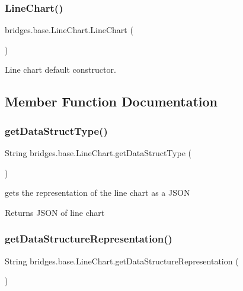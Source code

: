 \subsubsection{\texorpdfstring{Line\+Chart()}{LineChart()}}
{\footnotesize\ttfamily bridges.\+base.\+Line\+Chart.\+Line\+Chart (\begin{DoxyParamCaption}{ }\end{DoxyParamCaption})}



Line chart default constructor. 



\subsection{Member Function Documentation}
\mbox{\label{classbridges_1_1base_1_1_line_chart_ae5d7ebffc6f29256f6fff368ef9a6c84}} 
\subsubsection{\texorpdfstring{get\+Data\+Struct\+Type()}{getDataStructType()}}
{\footnotesize\ttfamily String bridges.\+base.\+Line\+Chart.\+get\+Data\+Struct\+Type (\begin{DoxyParamCaption}{ }\end{DoxyParamCaption})}



gets the representation of the line chart as a J\+S\+ON 

\begin{DoxyReturn}{Returns}
J\+S\+ON of line chart 
\end{DoxyReturn}
\mbox{\label{classbridges_1_1base_1_1_line_chart_a1d481880dc94fc8c2dfdcf64d2de2a3b}} 
\subsubsection{\texorpdfstring{get\+Data\+Structure\+Representation()}{getDataStructureRepresentation()}}
{\footnotesize\ttfamily String bridges.\+base.\+Line\+Chart.\+get\+Data\+Structure\+Representation (\begin{DoxyParamCaption}{ }\end{DoxyParamCaption})}

